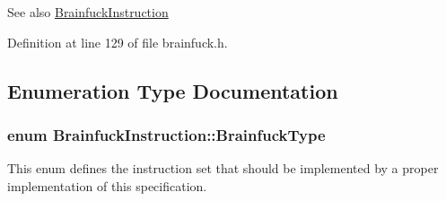 \begin{DoxySeeAlso}{See also}
\hyperlink{structBrainfuckInstruction}{Brainfuck\+Instruction} 
\end{DoxySeeAlso}


Definition at line 129 of file brainfuck.\+h.



\subsection{Enumeration Type Documentation}
\hypertarget{group__ast_ga536105595916938ef76e66bb1cdf7b2b}{}
\subsubsection[{Brainfuck\+Type}]{\setlength{\rightskip}{0pt plus 5cm}enum {\bf Brainfuck\+Instruction\+::\+Brainfuck\+Type}}\label{group__ast_ga536105595916938ef76e66bb1cdf7b2b}


This enum defines the instruction set that should be implemented by a proper implementation of this specification. 


